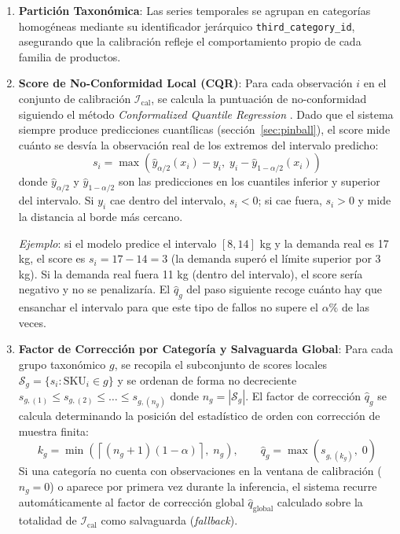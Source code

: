 \begin{enumerate}
    \item \textbf{Partición Taxonómica}: Las series temporales se agrupan en categorías homogéneas
    mediante su identificador jerárquico \texttt{third\_category\_id}, asegurando que la
    calibración refleje el comportamiento propio de cada familia de productos.

    \item \textbf{Score de No-Conformidad Local (CQR)}: Para cada observación $i$ en el conjunto
    de calibración $\mathcal{I}_{\text{cal}}$, se calcula la puntuación de no-conformidad
    siguiendo el método \textit{Conformalized Quantile Regression} \cite{romano2019conformalized}.
    Dado que el sistema siempre produce predicciones cuantílicas (sección~\ref{sec:pinball}),
    el score mide cuánto se desvía la observación real de los extremos del intervalo predicho:
    \begin{equation}
        s_i = \max \left( \hat{y}_{\alpha/2}(x_i) - y_i, \;
        y_i - \hat{y}_{1-\alpha/2}(x_i) \right)
    \end{equation}
    donde $\hat{y}_{\alpha/2}$ y $\hat{y}_{1-\alpha/2}$ son las predicciones en los cuantiles
    inferior y superior del intervalo. Si $y_i$ cae dentro del intervalo, $s_i < 0$; si cae
    fuera, $s_i > 0$ y mide la distancia al borde más cercano.

    \textit{Ejemplo}: si el modelo predice el intervalo $[8, 14]$ kg y la demanda real es
    17 kg, el score es $s_i = 17 - 14 = 3$ (la demanda superó el límite superior por 3 kg).
    Si la demanda real fuera 11 kg (dentro del intervalo), el score sería negativo y no se
    penalizaría. El $\hat{q}_g$ del paso siguiente recoge cuánto hay que ensanchar el
    intervalo para que este tipo de fallos no supere el $\alpha\%$ de las veces.

    \item \textbf{Factor de Corrección por Categoría y Salvaguarda Global}: Para cada grupo taxonómico $g$, se recopila el subconjunto de scores locales $\mathcal{S}_g = \{s_i : \text{SKU}_i \in g\}$ y se ordenan de forma no decreciente $s_{g,(1)} \le s_{g,(2)} \le \dots \le s_{g,(n_g)}$ donde $n_g = |\mathcal{S}_g|$. El factor de corrección $\hat{q}_g$ se calcula determinando la posición del estadístico de orden con corrección de muestra finita:
    \begin{equation}
        k_g = \min\left( \left\lceil (n_g + 1)(1 - \alpha) \right\rceil,\; n_g \right), \qquad \hat{q}_g = \max\left( s_{g,(k_g)},\; 0 \right)
    \end{equation}
    Si una categoría no cuenta con observaciones en la ventana de calibración ($n_g = 0$) o aparece por primera vez durante la inferencia, el sistema recurre automáticamente al factor de corrección global $\hat{q}_{\text{global}}$ calculado sobre la totalidad de $\mathcal{I}_{\text{cal}}$ como salvaguarda (\textit{fallback}).


\end{enumerate}
